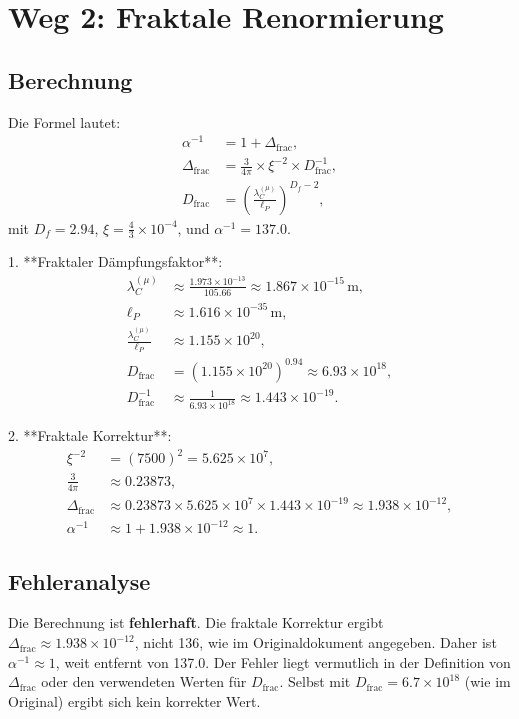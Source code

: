 \documentclass[12pt,a4paper]{article}
\theoremstyle{definition}
\begin{document}
	\section{Weg 2: Fraktale Renormierung}
	\subsection{Berechnung}
	Die Formel lautet:
	\begin{align}
		\alpha^{-1} &= 1 + \Delta_{\text{frac}}, \\
		\Delta_{\text{frac}} &= \frac{3}{4\pi} \times \xi^{-2} \times D_{\text{frac}}^{-1}, \\
		D_{\text{frac}} &= \left( \frac{\lambda_C^{(\mu)}}{\ell_P} \right)^{D_f - 2},
	\end{align}
	mit \(D_f = 2.94\), \(\xi = \frac{4}{3} \times 10^{-4}\), und \(\alpha^{-1} = 137.0\).
	
	1. **Fraktaler Dämpfungsfaktor**:
	\begin{align}
		\lambda_C^{(\mu)} &\approx \frac{1.973 \times 10^{-13}}{105.66} \approx 1.867 \times 10^{-15} \, \text{m}, \\
		\ell_P &\approx 1.616 \times 10^{-35} \, \text{m}, \\
		\frac{\lambda_C^{(\mu)}}{\ell_P} &\approx 1.155 \times 10^{20}, \\
		D_{\text{frac}} &= (1.155 \times 10^{20})^{0.94} \approx 6.93 \times 10^{18}, \\
		D_{\text{frac}}^{-1} &\approx \frac{1}{6.93 \times 10^{18}} \approx 1.443 \times 10^{-19}.
	\end{align}
	
	2. **Fraktale Korrektur**:
	\begin{align}
		\xi^{-2} &= (7500)^2 = 5.625 \times 10^7, \\
		\frac{3}{4\pi} &\approx 0.23873, \\
		\Delta_{\text{frac}} &\approx 0.23873 \times 5.625 \times 10^7 \times 1.443 \times 10^{-19} \approx 1.938 \times 10^{-12}, \\
		\alpha^{-1} &\approx 1 + 1.938 \times 10^{-12} \approx 1.
	\end{align}
	
	\subsection{Fehleranalyse}
	\begin{tcolorbox}[colback=red!5!white,colframe=deepred,title=Fehler]
		Die Berechnung ist \textbf{fehlerhaft}. Die fraktale Korrektur ergibt \(\Delta_{\text{frac}} \approx 1.938 \times 10^{-12}\), nicht 136, wie im Originaldokument angegeben. Daher ist \(\alpha^{-1} \approx 1\), weit entfernt von 137.0. Der Fehler liegt vermutlich in der Definition von \(\Delta_{\text{frac}}\) oder den verwendeten Werten für \(D_{\text{frac}}\). Selbst mit \(D_{\text{frac}} = 6.7 \times 10^{18}\) (wie im Original) ergibt sich kein korrekter Wert.
	\end{tcolorbox}
	
\end{document}
